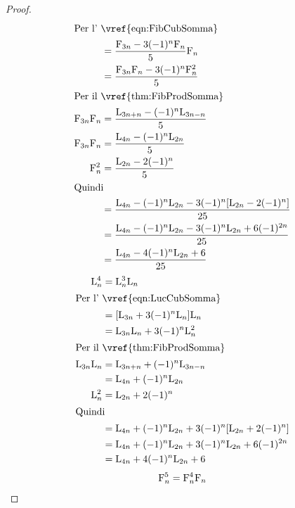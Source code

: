 \begin{proof}
\begin{align*}
		\intertext{Per l'~\vref{eqn:FibCubSomma}}
		={}                & \dfrac{\Fib{3n}-3(-1)^n\Fib{n}}{5}\Fib{n}                      \\
		={}                & \dfrac{\Fib{3n}\Fib{n}-3(-1)^n\Fib{n}^2}{5}                    \\
		\intertext{Per il~\vref{thm:FibProdSomma}}
		\Fib{3n}\Fib{n}={} & \dfrac{\Luc{3n+n}-(-1)^n\Luc{3n-n}}{5}                         \\
		\Fib{3n}\Fib{n}={} & \dfrac{\Luc{4n}-(-1)^n\Luc{2n}}{5}                             \\
		\Fib{n}^2={}       & \dfrac{\Luc{2n}-2(-1)^n}{5}                                    \\
		\intertext{Quindi}
		={}                & \dfrac{\Luc{4n}-(-1)^n\Luc{2n}-3(-1)^n[\Luc{2n}-2(-1)^n]}{25}  \\
		={}                & \dfrac{\Luc{4n}-(-1)^n\Luc{2n}-3(-1)^n\Luc{2n}+6(-1)^{2n}}{25} \\
		={}                & \dfrac{\Luc{4n}-4(-1)^n\Luc{2n}+6}{25}                         \\
	\end{align*}
	\begin{align*}
		\Luc{n}^4={}       & \Luc{n}^3\Luc{n}                                   \\
		\intertext{Per l'~\vref{eqn:LucCubSomma}}
		={}                & [\Luc{3n}+3(-1)^n\Luc{n}]\Luc{n}                   \\
		={}                & \Luc{3n}\Luc{n}+3(-1)^n\Luc{n}^2                   \\
		\intertext{Per il~\vref{thm:FibProdSomma}}
		\Luc{3n}\Luc{n}={} & \Luc{3n+n}+(-1)^n\Luc{3n-n}                        \\
		={}                & \Luc{4n}+(-1)^n\Luc{2n}                            \\
		\Luc{n}^2={}       & \Luc{2n}+2(-1)^n                                   \\
		\intertext{Quindi}
		={}                & \Luc{4n}+(-1)^n\Luc{2n}+3(-1)^n[\Luc{2n}+2(-1)^n]  \\
		={}                & \Luc{4n}+(-1)^n\Luc{2n}+3(-1)^n\Luc{2n}+6(-1)^{2n} \\
		={}                & \Luc{4n}+4(-1)^n\Luc{2n}+6                         \\
	\end{align*}
	\begin{align*}
		\Fib{n}^5={}       & \Fib{n}^4\Fib{n}                                                                      \\

\end{align*}
\end{proof}
